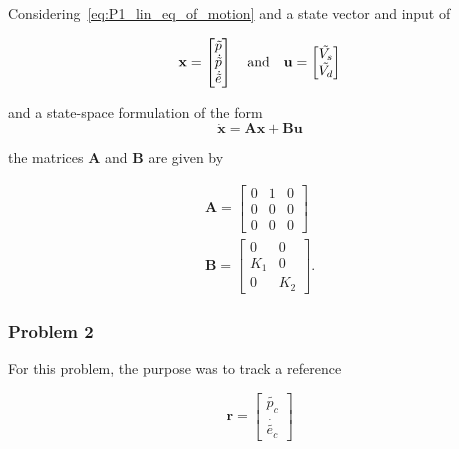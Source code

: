 Considering~\cref{eq:P1_lin_eq_of_motion} and a state vector and input of  

\begin{equation}\label{P3_state_vector_and_input}
    \mathbf{x}=
    \begin{bmatrix}
        \tilde{p}\\
        \dot{\tilde{p}}\\
        \dot{\tilde{e}}
    \end{bmatrix}
    \quad\text{and}\quad
    \mathbf{u}=
    \begin{bmatrix}
        \tilde{V_s}\\
        \tilde{V_d}
    \end{bmatrix}
\end{equation}

and a state-space formulation of the form
\begin{equation}\label{eq:P3_state_space_equation}
    \dot{\mathbf{x}}=\mathbf{Ax}+\mathbf{Bu}    
\end{equation}

the matrices $\mathbf{A}$ and $\mathbf{B}$ are given by 

\begin{subequations}\label{eq:P3_p1_A_B}
    \begin{align}
        \mathbf{A}=
            \begin{bmatrix}
                0&1&0\\
                0&0&0\\
                0&0&0
            \end{bmatrix}\label{eq:P3_p1_A} \\
        \mathbf{B}=
            \begin{bmatrix}
                0&0\\
                K_1&0\\
                0&K_2
            \end{bmatrix}\label{eq:P3_p1_B}.
    \end{align}
\end{subequations}

\subsubsection{Problem 2}

For this problem, the purpose was to track a reference

\begin{equation}\label{eq:P3_p2_reference}
    \mathbf{r}=
        \begin{bmatrix}
            \tilde{p_c}\\
            \dot{\tilde{e_c}}
        \end{bmatrix}
\end{equation}

